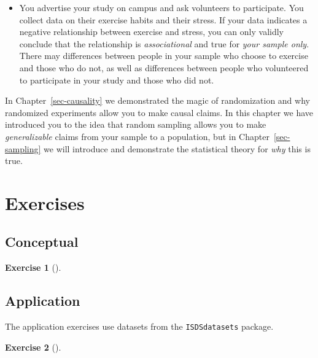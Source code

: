 \documentclass[
  letterpaper,
  DIV=11,
  numbers=noendperiod]{scrreprt}
\providecommand{\tightlist}{%
  \setlength{\itemsep}{0pt}\setlength{\parskip}{0pt}}\usepackage{longtable,booktabs,array}
\theoremstyle{definition}
\newtheorem{exercise}{Exercise}[chapter]
\theoremstyle{remark}
\begin{document}
\begin{itemize}
  \begin{itemize}
  \tightlist
  \item
    You advertise your study on campus and ask volunteers to
    participate. You collect data on their exercise habits and their
    stress. If your data indicates a negative relationship between
    exercise and stress, you can only validly conclude that the
    relationship is \emph{associational} and true for \emph{your sample
    only}. There may differences between people in your sample who
    choose to exercise and those who do not, as well as differences
    between people who volunteered to participate in your study and
    those who did not.
  \end{itemize}
\end{itemize}

In Chapter~\ref{sec-causality} we demonstrated the magic of
randomization and why randomized experiments allow you to make causal
claims. In this chapter we have introduced you to the idea that random
sampling allows you to make \emph{generalizable} claims from your sample
to a population, but in Chapter~\ref{sec-sampling} we will introduce and
demonstrate the statistical theory for \emph{why} this is true.

\hypertarget{sec-ex08}{%
\section{Exercises}\label{sec-ex08}}

\hypertarget{sec-ex08-conceptual}{%
\subsection{Conceptual}\label{sec-ex08-conceptual}}

\leavevmode{}%
\begin{exercise}[]\label{exr-ch08-c01}

\end{exercise}

\hypertarget{sec-ex08-application}{%
\subsection{Application}\label{sec-ex08-application}}

The application exercises use datasets from the \texttt{ISDSdatasets}
package.

\leavevmode{}%
\begin{exercise}[]\label{exr-ch08-app1}

\end{exercise}
\end{document}
